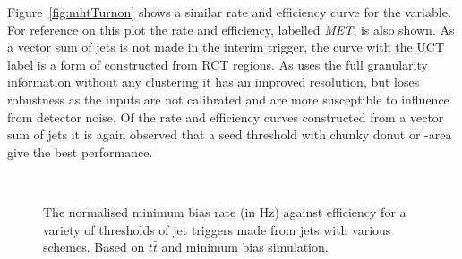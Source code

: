 Figure~\ref{fig:mhtTurnon} shows a similar rate and efficiency curve
for the \MHT variable. For reference on this plot the \MET rate and
efficiency, labelled \emph{MET}, is also shown. As a
vector sum of jets is not made in the interim trigger, the curve with
the UCT label is a form of \MET constructed from \ac{RCT} regions. As \MET
uses the full granularity \TT information without any clustering it
has an improved resolution, but loses robustness as the inputs are not
calibrated and are more susceptible to influence from detector noise.
Of the rate and efficiency curves constructed from a vector sum of
jets it is again observed that a seed threshold with chunky donut or
\rho-area \PUS give the best performance.

\begin{figure}
  \centering
  ~ 
  \caption{ The normalised minimum bias rate (in Hz) against efficiency for a
  variety of thresholds of jet triggers
  made from jets with various \PUS schemes. Based on $t\bar{t}$ and
  minimum bias \MC simulation.}
  \label{fig:rateEffJet}
\end{figure}

